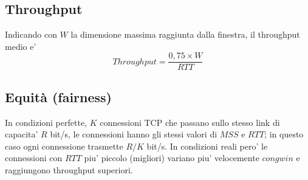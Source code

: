 \subsection{Throughput}
Indicando con $W$ la dimensione massima raggiunta dalla finestra, il throughput medio e'
\[ Throughput = \dfrac{0,75 \times W}{RTT} \]
\subsection{Equità (fairness)}
In condizioni perfette, $K$ connessioni TCP che passano sullo stesso link di capacita' $R$ bit/s, le connessioni hanno gli stessi valori di $MSS$ e $RTT$; in questo caso ogni connessione trasmette $R/K$ bit/s.
In condizioni reali pero' le connessioni con $RTT$ piu' piccolo (migliori) variano piu' velocemente $congwin$ e raggiungono throughput superiori.
